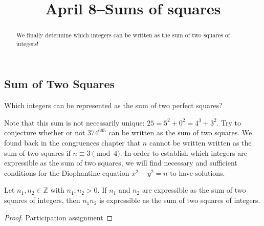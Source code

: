 \documentclass{ximera}
\title{April 8--Sums of squares}
\begin{document}
  
\begin{abstract}  
We finally determine which integers can be written as the sum of two squares of integers!
\end{abstract}
\maketitle  

\subsection{Sum of Two Squares}
Which integers can be represented as the sum of two perfect squares? 

\begin{selectAll}
 \end{selectAll}
 \begin{selectAll}
\end{selectAll}

Note that this sum is not necessarily unique: $25=5^2+0^2=4^3+3^2$. Try to conjecture whether or not $374^{695}$ can be written as the sum of two squares. We found back in the congruences chapter that $n$ cannot be written written as the sum of two squares if $n\equiv 3 \pmod 4$. In order to establish which integers are expressible as the sum of two squares, we will find necessary and sufficient conditions for the Diophantine equation $x^2+y^2=n$ to have solutions.

\begin{theorem}
 Let $n_1,n_2\in\mathbb{Z}$ with $n_1,n_2>0$. If $n_1$ and $n_2$ are expressible as the sum of two squares of integers, then $n_1n_2$ is expressible as the sum of two squares of integers.
\end{theorem}
\begin{proof}
Participation assignment
\end{proof}
\end{document}
